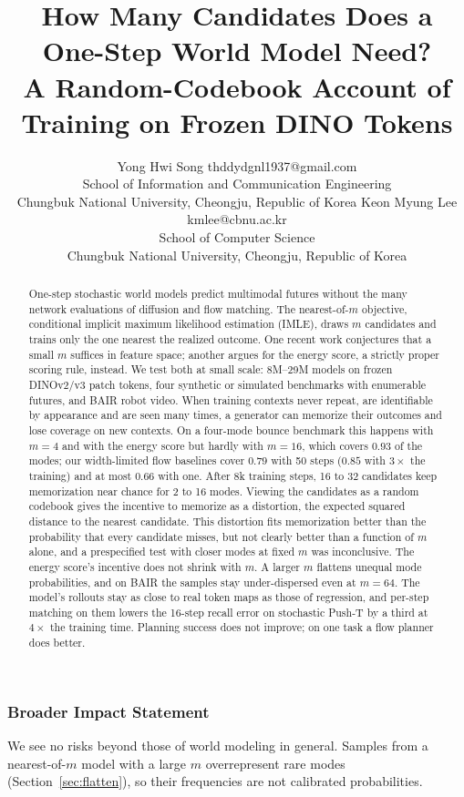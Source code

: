 \documentclass[10pt]{article} %
\title{How Many Candidates Does a One-Step World Model Need?\\A Random-Codebook Account of \Nom{} Training on Frozen DINO Tokens}
\author{\name Yong Hwi Song \email thddydgnl1937@gmail.com \\
      \addr School of Information and Communication Engineering\\
      Chungbuk National University, Cheongju, Republic of Korea
      \AND
      \name Keon Myung Lee \email kmlee@cbnu.ac.kr \\
      \addr School of Computer Science\\
      Chungbuk National University, Cheongju, Republic of Korea}
\newcommand{\nom}{nearest-of-$m$}
\begin{document}
\maketitle

\begin{abstract}
One-step stochastic world models predict multimodal futures without the many network evaluations of diffusion and flow matching. The \nom{} objective, conditional implicit maximum likelihood estimation (IMLE), draws $m$ candidates and trains only the one nearest the realized outcome. One recent work conjectures that a small $m$ suffices in feature space; another argues for the energy score, a strictly proper scoring rule, instead. We test both at small scale: 8M--29M models on frozen DINOv2/v3 patch tokens, four synthetic or simulated benchmarks with enumerable futures, and BAIR robot video. When training contexts never repeat, are identifiable by appearance and are seen many times, a generator can memorize their outcomes and lose coverage on new contexts. On a four-mode bounce benchmark this happens with $m{=}4$ and with the energy score but hardly with $m{=}16$, which covers $0.93$ of the modes; our width-limited flow baselines cover $0.79$ with 50 steps ($0.85$ with $3\times$ the training) and at most $0.66$ with one. After 8k training steps, 16 to 32 candidates keep memorization near chance for 2 to 16 modes. Viewing the candidates as a random codebook gives the incentive to memorize as a distortion, the expected squared distance to the nearest candidate. This distortion fits memorization better than the probability that every candidate misses, but not clearly better than a function of $m$ alone, and a prespecified test with closer modes at fixed $m$ was inconclusive. The energy score's incentive does not shrink with $m$. A larger $m$ flattens unequal mode probabilities, and on BAIR the samples stay under-dispersed even at $m{=}64$. The model's rollouts stay as close to real token maps as those of regression, and per-step matching on them lowers the 16-step recall error on stochastic Push-T by a third at $4\times$ the training time. Planning success does not improve; on one task a flow planner does better.
\end{abstract}












\subsubsection*{Broader Impact Statement}
We see no risks beyond those of world modeling in general. Samples from a \nom{} model with a large $m$ overrepresent rare modes (Section~\ref{sec:flatten}), so their frequencies are not calibrated probabilities.




\appendix
\FloatBarrier
\setcounter{figure}{0}\setcounter{table}{0}
\renewcommand{\thefigure}{S\arabic{figure}}\renewcommand{\thetable}{S\arabic{table}}
\renewcommand{\theHfigure}{S\arabic{figure}}\renewcommand{\theHtable}{S\arabic{table}}

\end{document}
